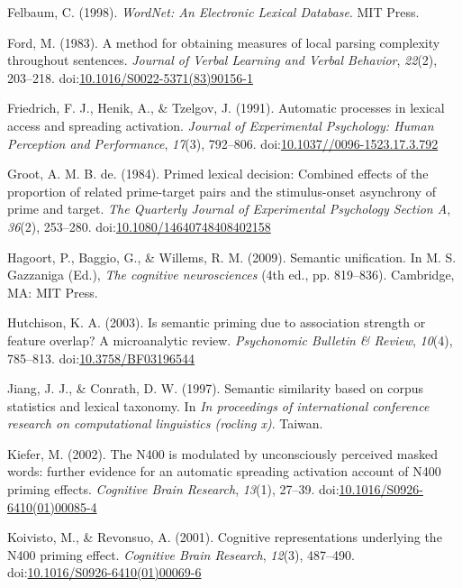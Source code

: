 \documentclass[english,man]{apa6}
\theoremstyle{definition}
\theoremstyle{definition}
\theoremstyle{remark}
\begin{document}
\hypertarget{ref-Felbaum1998}{}
Felbaum, C. (1998). \emph{WordNet: An Electronic Lexical Database}. MIT
Press.

\hypertarget{ref-Ford1983}{}
Ford, M. (1983). A method for obtaining measures of local parsing
complexity throughout sentences. \emph{Journal of Verbal Learning and
Verbal Behavior}, \emph{22}(2), 203--218.
doi:\href{https://doi.org/10.1016/S0022-5371(83)90156-1}{10.1016/S0022-5371(83)90156-1}

\hypertarget{ref-Friedrich1991}{}
Friedrich, F. J., Henik, A., \& Tzelgov, J. (1991). Automatic processes
in lexical access and spreading activation. \emph{Journal of
Experimental Psychology: Human Perception and Performance},
\emph{17}(3), 792--806.
doi:\href{https://doi.org/10.1037//0096-1523.17.3.792}{10.1037//0096-1523.17.3.792}

\hypertarget{ref-DeGroot1984}{}
Groot, A. M. B. de. (1984). Primed lexical decision: Combined effects of
the proportion of related prime-target pairs and the stimulus-onset
asynchrony of prime and target. \emph{The Quarterly Journal of
Experimental Psychology Section A}, \emph{36}(2), 253--280.
doi:\href{https://doi.org/10.1080/14640748408402158}{10.1080/14640748408402158}

\hypertarget{ref-Hagoort2009}{}
Hagoort, P., Baggio, G., \& Willems, R. M. (2009). Semantic unification.
In M. S. Gazzaniga (Ed.), \emph{The cognitive neurosciences} (4th ed.,
pp. 819--836). Cambridge, MA: MIT Press.

\hypertarget{ref-Hutchison2003}{}
Hutchison, K. A. (2003). Is semantic priming due to association strength
or feature overlap? A microanalytic review. \emph{Psychonomic Bulletin
\& Review}, \emph{10}(4), 785--813.
doi:\href{https://doi.org/10.3758/BF03196544}{10.3758/BF03196544}

\hypertarget{ref-Jiang1997}{}
Jiang, J. J., \& Conrath, D. W. (1997). Semantic similarity based on
corpus statistics and lexical taxonomy. In \emph{In proceedings of
international conference research on computational linguistics (rocling
x)}. Taiwan.

\hypertarget{ref-Kiefer2002}{}
Kiefer, M. (2002). The N400 is modulated by unconsciously perceived
masked words: further evidence for an automatic spreading activation
account of N400 priming effects. \emph{Cognitive Brain Research},
\emph{13}(1), 27--39.
doi:\href{https://doi.org/10.1016/S0926-6410(01)00085-4}{10.1016/S0926-6410(01)00085-4}

\hypertarget{ref-Koivisto2001}{}
Koivisto, M., \& Revonsuo, A. (2001). Cognitive representations
underlying the N400 priming effect. \emph{Cognitive Brain Research},
\emph{12}(3), 487--490.
doi:\href{https://doi.org/10.1016/S0926-6410(01)00069-6}{10.1016/S0926-6410(01)00069-6}
\end{document}
